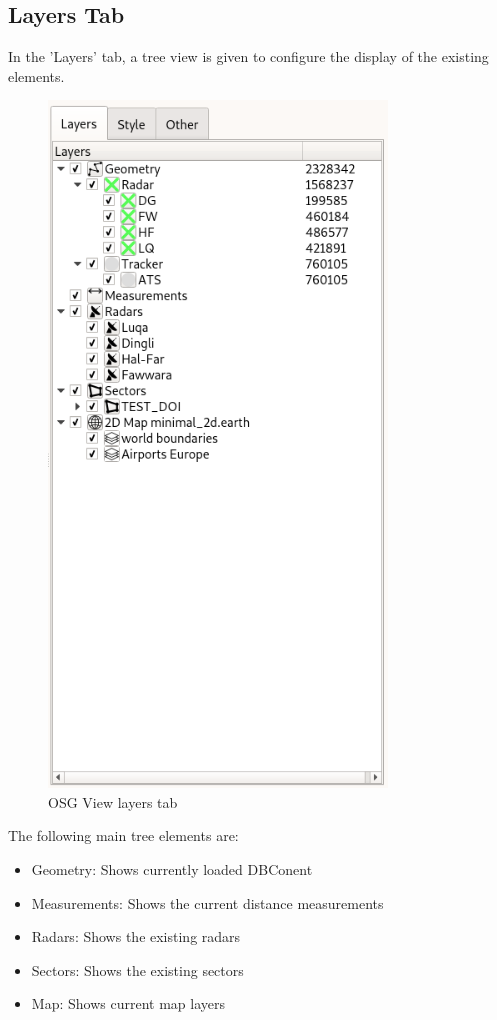 \subsection{Layers Tab}

In the 'Layers' tab, a tree view is given to configure the display of the existing elements. 

\begin{figure}[H]
  \center
    \includegraphics[width=9cm,frame]{figures/osgview_layers.png}
  \caption{OSG View layers tab}
\end{figure}

The following main tree elements are:\\

\begin{itemize}
 \item Geometry: Shows currently loaded DBConent
 \item Measurements: Shows the current distance measurements
 \item Radars: Shows the existing radars 
 \item Sectors: Shows the existing sectors
 \item Map: Shows current map layers
\end{itemize} 
 \ \\

